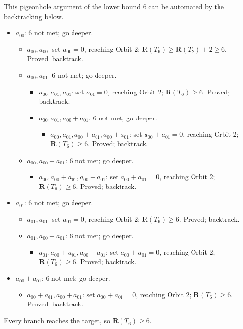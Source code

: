 \documentclass[11pt]{article}
\theoremstyle{definition}
\newcommand{\R}{\mathbf{R}}
\begin{document}
This pigeonhole argument of the lower bound 6 can be automated by the backtracking below.
\begin{itemize}
  \item $a_{00}$: $6$ not met; go deeper.
    \begin{itemize}
      \item $a_{00},a_{00}$: set $a_{00}=0$, reaching Orbit 2; $\R(T_6)\ge\R(T_2)+2\ge 6$. Proved; backtrack.
      \item $a_{00},a_{01}$: $6$ not met; go deeper.
        \begin{itemize}
          \item $a_{00},a_{01},a_{01}$: set $a_{01}=0$, reaching Orbit 2; $\R(T_6)\ge 6$. Proved; backtrack.
          \item $a_{00},a_{01},a_{00}+a_{01}$: $6$ not met; go deeper.
            \begin{itemize}
              \item $a_{00},a_{01},a_{00}+a_{01},a_{00}+a_{01}$: set $a_{00}+a_{01}=0$, reaching Orbit 2; $\R(T_6)\ge 6$. Proved; backtrack.
            \end{itemize}
        \end{itemize}
      \item $a_{00},a_{00}+a_{01}$: $6$ not met; go deeper.
        \begin{itemize}
          \item $a_{00},a_{00}+a_{01},a_{00}+a_{01}$: set $a_{00}+a_{01}=0$, reaching Orbit 2; $\R(T_6)\ge 6$. Proved; backtrack.
        \end{itemize}
    \end{itemize}
  \item $a_{01}$: $6$ not met; go deeper.
    \begin{itemize}
      \item $a_{01},a_{01}$: set $a_{01}=0$, reaching Orbit 2; $\R(T_6)\ge 6$. Proved; backtrack.
      \item $a_{01},a_{00}+a_{01}$: $6$ not met; go deeper.
        \begin{itemize}
          \item $a_{01},a_{00}+a_{01},a_{00}+a_{01}$: set $a_{00}+a_{01}=0$, reaching Orbit 2; $\R(T_6)\ge 6$. Proved; backtrack.
        \end{itemize}
    \end{itemize}
  \item $a_{00}+a_{01}$: $6$ not met; go deeper.
    \begin{itemize}
      \item $a_{00}+a_{01},a_{00}+a_{01}$: set $a_{00}+a_{01}=0$, reaching Orbit 2; $\R(T_6)\ge 6$. Proved; backtrack.
    \end{itemize}
\end{itemize}
Every branch reaches the target, so $\R(T_6)\ge 6$.
\end{document}
